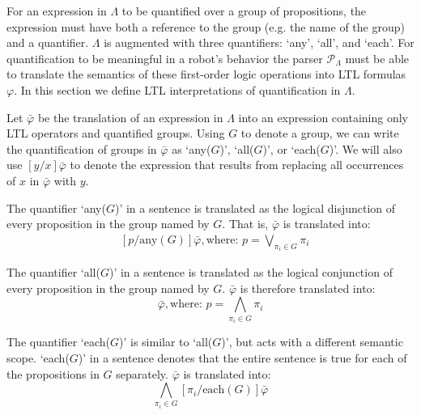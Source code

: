 For an expression in $\Lambda$ to be quantified over a group of propositions, the expression must have both a reference to the group (e.g. the name of the group) and a quantifier. 
$\Lambda$ is augmented with three quantifiers: `any', `all', and `each'. 
For quantification to be meaningful in a robot's behavior the parser $\mathcal{P}_{\Lambda}$ must be able to translate the semantics of these first-order logic operations into LTL formulas $\varphi$.
In this section we define LTL interpretations of quantification in $\Lambda$.  

Let $\bar{\varphi}$ be the translation of an expression in $\Lambda$ into an expression containing only LTL operators and quantified groups. 
Using $G$ to denote a group, we can write the quantification of groups in $\bar{\varphi}$ as `any($G$)', `all($G$)', or `each($G$)'. 
We will also use $[y/x]\bar{\varphi}$ to denote the expression that results from replacing all occurrences of $x$ in $\bar{\varphi}$ with $y$. 
\par
The quantifier `any($G$)' in a sentence is translated as the logical disjunction of every proposition in the group named by $G$. 
That is, $\bar{\varphi}$ is translated into: 
\begin{align*}
	&[ p / \text{any}(G)] \bar{\varphi}, \text{where: } p = \bigvee \limits_{\pi_i \in G} \pi_i
\end{align*}
\par
The quantifier `all($G$)' in a sentence is translated as the logical conjunction of every proposition in the group named by $G$. 
$\bar{\varphi}$ is therefore translated into: 
\begin{equation*}
	[ p / \text{all}(G)] \bar{\varphi}, \text{where: } p = \bigwedge \limits_{\pi_i \in G} \pi_i
\end{equation*}
\par
The quantifier `each($G$)' is similar to `all($G$)', but acts with a different semantic scope. 
`each($G$)' in a sentence denotes that the entire sentence is true for each of the propositions in $G$ separately. 
$\bar{\varphi}$ is translated into:
\begin{equation*}
 	\bigwedge\limits_{\pi_i \in G} [\pi_i / \text{each}(G)] \bar{\varphi}
\end{equation*}
\par
